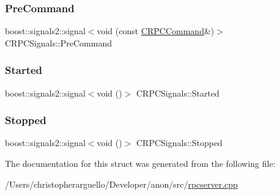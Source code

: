 \subsubsection{\texorpdfstring{Pre\+Command}{PreCommand}}
{\footnotesize\ttfamily boost\+::signals2\+::signal$<$void (const \mbox{\hyperlink{class_c_r_p_c_command}{C\+R\+P\+C\+Command}}\&)$>$ C\+R\+P\+C\+Signals\+::\+Pre\+Command}

\mbox{\label{struct_c_r_p_c_signals_a201ab59320dae51002203903e66ec1a7}} 
\subsubsection{\texorpdfstring{Started}{Started}}
{\footnotesize\ttfamily boost\+::signals2\+::signal$<$void ()$>$ C\+R\+P\+C\+Signals\+::\+Started}

\mbox{\label{struct_c_r_p_c_signals_a60800aedbc7b1e912cb4b432f3db7e99}} 
\subsubsection{\texorpdfstring{Stopped}{Stopped}}
{\footnotesize\ttfamily boost\+::signals2\+::signal$<$void ()$>$ C\+R\+P\+C\+Signals\+::\+Stopped}



The documentation for this struct was generated from the following file\+:\begin{DoxyCompactItemize}
\item 
/\+Users/christopherarguello/\+Developer/anon/src/\mbox{\hyperlink{rpcserver_8cpp}{rpcserver.\+cpp}}\end{DoxyCompactItemize}
